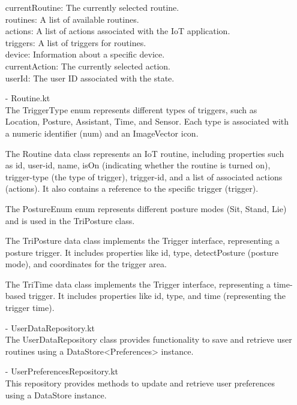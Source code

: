 \begin{enumerate}
                              currentRoutine: The currently selected routine.\\
                              routines: A list of available routines.\\
                              actions: A list of actions associated with the IoT application.\\
                              triggers: A list of triggers for routines.\\
                              device: Information about a specific device.\\
                              currentAction: The currently selected action.\\
                              userId: The user ID associated with the state.\\
                        \item[-] Routine.kt\\
                              The TriggerType enum represents different types of triggers, such as Location, Posture, Assistant, Time, and Sensor. Each type is associated with a numeric identifier (num) and an ImageVector icon.

                              The Routine data class represents an IoT routine, including properties such as id, user-id, name, isOn (indicating whether the routine is turned on), trigger-type (the type of trigger), trigger-id, and a list of associated actions (actions). It also contains a reference to the specific trigger (trigger).

                              The PostureEnum enum represents different posture modes (Sit, Stand, Lie) and is used in the TriPosture class.

                              The TriPosture data class implements the Trigger interface, representing a posture trigger. It includes properties like id, type, detectPosture (posture mode), and coordinates for the trigger area.

                              The TriTime data class implements the Trigger interface, representing a time-based trigger. It includes properties like id, type, and time (representing the trigger time).\\
                        \item[-] UserDataRepository.kt\\
                              The UserDataRepository class provides functionality to save and retrieve user routines using a DataStore<Preferences> instance.\\
                        \item[-] UserPreferencesRepository.kt\\
                              This repository provides methods to update and retrieve user preferences using a DataStore instance.


\end{enumerate}
